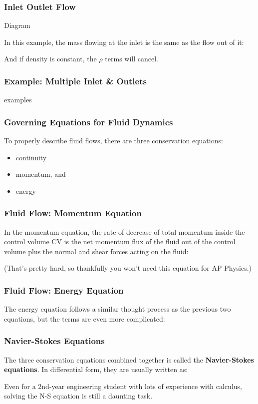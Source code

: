 \documentclass[12pt,aspectratio=169]{beamer}
\newcommand{\mb}[1]{\mathbf{#1}}
\newcommand{\eq}[2]{\vspace{#1}{\Large\begin{displaymath}#2\end{displaymath}}}
\begin{document}
\begin{frame}
  \frametitle{Inlet Outlet Flow}
  \begin{center}
    Diagram
  \end{center}
  In this example, the mass flowing at the inlet is the same as the flow out of
  it:

  \eq{-.2in}{
    \rho_1 v_1A_1=\rho_2 v_2A_2
  }
  And if density is constant, the $\rho$ terms will cancel.
\end{frame}

      
\begin{frame}
  \frametitle{Example: Multiple Inlet \& Outlets}
    examples
\end{frame}

\begin{frame}
  \frametitle{Governing Equations for Fluid Dynamics}

  To properly describe fluid flows, there are three conservation equations:
  \begin{itemize}
  \item continuity
  \item momentum, and
  \item energy
  \end{itemize}
\end{frame}

\begin{frame}
  \frametitle{Fluid Flow: Momentum Equation}
  In the momentum equation, the rate of decrease of total momentum inside the
  control volume CV is the net momentum flux of the fluid out of the control
  volume plus the normal and shear forces acting on the fluid:

  \eq{-.2in}{
    \frac{\partial(\rho\mb{v})}{\partial t} +
    \rho(\mb{v}\cdot\nabla)\mb{v} =
    -\nabla p +\mb{f}+\mu\nabla^2\mb{v}
  }
  (That's pretty hard, so thankfully you won't need this equation for AP
  Physics.)
\end{frame}

\begin{frame}
  \frametitle{Fluid Flow: Energy Equation}
  The energy equation follows a similar thought process as the previous two
  equations, but the terms are even more complicated:


\end{frame}


\begin{frame}
  \frametitle{Navier-Stokes Equations}
  The three conservation equations combined together is called the
  \textbf{Navier-Stokes equations}. In differential form, they are usually
  written as:


  Even for a 2nd-year engineering student with lots of experience with
  calculus, solving the N-S equation is still a daunting task.
\end{frame}
\end{document}
